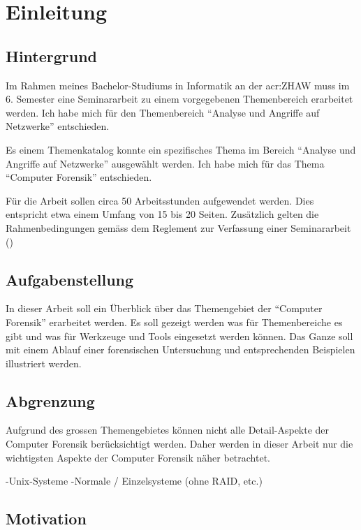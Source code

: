 
\chapter{Einleitung}

\section{Hintergrund}
Im Rahmen meines Bachelor-Studiums in Informatik an der \gls{acr:ZHAW} muss im 6. Semester eine Seminararbeit zu einem vorgegebenen Themenbereich erarbeitet werden. Ich habe mich für den Themenbereich "`Analyse und Angriffe auf Netzwerke"' entschieden.

Es einem Themenkatalog konnte ein spezifisches Thema im Bereich "`Analyse und Angriffe auf Netzwerke"' ausgewählt werden. Ich habe mich für das Thema "`Computer Forensik"' entschieden.

Für die Arbeit sollen circa 50 Arbeitsstunden aufgewendet werden. Dies entspricht etwa einem Umfang von 15 bis 20 Seiten. Zusätzlich gelten die Rahmenbedingungen gemäss dem Reglement zur Verfassung einer Seminararbeit (\cite{ZHAW:2012:Seminararbeit:Reglemente})

\section{Aufgabenstellung}
In dieser Arbeit soll ein Überblick über das Themengebiet der "`Computer Forensik"' erarbeitet werden. Es soll gezeigt werden was für Themenbereiche es gibt und was für Werkzeuge und Tools eingesetzt werden können. Das Ganze soll mit einem Ablauf einer forensischen Untersuchung und entsprechenden Beispielen illustriert werden.

\section{Abgrenzung}
Aufgrund des grossen Themengebietes können nicht alle Detail-Aspekte der Computer Forensik berücksichtigt werden. Daher werden in dieser Arbeit nur die wichtigsten Aspekte der Computer Forensik näher betrachtet.

-Unix-Systeme
-Normale / Einzelsysteme (ohne RAID, etc.)

\section{Motivation}
